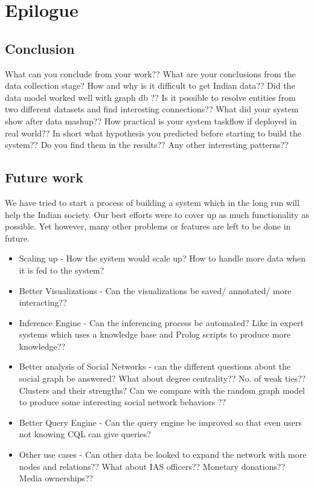 \chapter{Epilogue}
\section{Conclusion}
What can you conclude from your work?? What are your conclusions from the data collection stage? How and why is it difficult to get Indian data?? Did the data model worked well with graph db ?? Is it possible to resolve entities from two different datasets and find interesting connections??  What did your system show after data mashup?? How practical is your system taskflow if deployed in real world?? In short what hypothesis you predicted before starting to build the system?? Do you find them in the results?? Any other interesting patterns?? 

\section{Future work}
We have tried to start a process of building a system which in the long run will help the Indian society. Our best efforts were to cover up as much functionality as possible. Yet however, many other problems or features are left to be done in future.
\begin{itemize}
\item Scaling up - How the system would scale up? How to handle more data when it is fed to the system?
\item Better Visualizations - Can the visualizations be saved/ annotated/ more interacting??
\item Inference Engine - Can the inferencing process be automated? Like in expert systems which uses a knowledge base and Prolog scripts to produce more knowledge??
\item Better analysis of Social Networks - can the different questions about the social graph be answered? What about degree centrality?? No. of weak ties?? Clusters and their strengths? Can we compare with the random graph model to produce some interesting social network behaviors ??
\item Better Query Engine - Can the query engine be improved so that even users not knowing CQL can give queries?
\item Other use cases - Can other data be looked to expand the network with more nodes and relations?? What about IAS officers?? Monetary donations?? Media ownerships??
\end{itemize}
